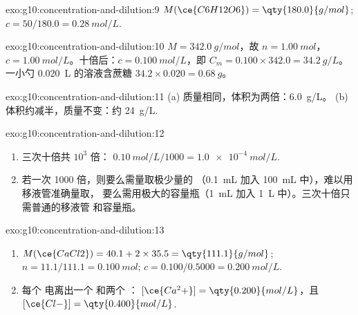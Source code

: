 \begin{solution}{exo:g10:concentration-and-dilution:9}
$M(\ce{C6H12O6}) = \qty{180.0}{g/mol}$; $c = 50 / 180.0 =
\qty{0.28}{mol/L}$.
\end{solution}

\begin{solution}{exo:g10:concentration-and-dilution:10}
$M = \qty{342.0}{g/mol}$，故 $n = \qty{1.00}{mol}$，$c =
\qty{1.00}{mol/L}$。十倍后：$c = \qty{0.100}{mol/L}$，即
$C_m = 0.100 \times 342.0 = \qty{34.2}{g/L}$。一小勺
\qty{0.020}{L} 的溶液含蔗糖 $34.2 \times 0.020 = \qty{0.68}{g}$。
\end{solution}

\begin{solution}{exo:g10:concentration-and-dilution:11}
(a) 质量相同，体积为两倍：\qty{6.0}{g/L}。
(b) 体积约减半，质量不变：约
\qty{24}{g/L}.
\end{solution}

\begin{solution}{exo:g10:concentration-and-dilution:12}
\begin{enumerate}
  \item 三次十倍共 $10^3$ 倍：
        $\qty{0.10}{mol/L} / 1000 = \qty{1.0e-4}{mol/L}$.
  \item 若一次 1000 倍，则要么需量取极少量的
        （\qty{0.1}{mL} 加入 \qty{100}{mL} 中），难以用移液管准确量取，
        要么需用极大的容量瓶（\qty{1}{mL} 加入
        \qty{1}{L} 中）。三次十倍只需普通的移液管
        和容量瓶。
\end{enumerate}
\end{solution}

\begin{solution}{exo:g10:concentration-and-dilution:13}
\begin{enumerate}
  \item $M(\ce{CaCl2}) = 40.1 + 2 \times 35.5 = \qty{111.1}{g/mol}$;
        $n = 11.1 / 111.1 = \qty{0.100}{mol}$; $c = 0.100 / 0.5000 =
        \qty{0.200}{mol/L}$.
  \item 每个  电离出一个  和两个 ：
        $[\ce{Ca^2+}] = \qty{0.200}{mol/L}$，且 $[\ce{Cl-}] =
        \qty{0.400}{mol/L}$.
\end{enumerate}
\end{solution}

